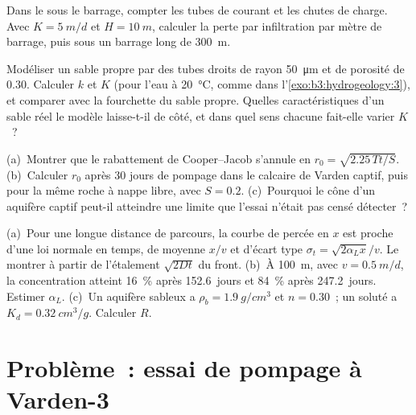 \begin{exercise}[$\star\star$]\label{exo:b3:hydrogeology:9}
Dans le  sous le barrage, compter les tubes de courant et les chutes de charge.
Avec $K = \qty{5}{m/d}$ et $H = \qty{10}{m}$, calculer la perte par infiltration par
mètre de barrage, puis sous un barrage long de \qty{300}{m}.
\end{exercise}

\begin{exercise}[$\star\star\star$]\label{exo:b3:hydrogeology:10}
Modéliser un sable propre par des tubes droits de rayon \qty{50}{\micro\metre} et de
porosité de 0.30. Calculer $k$ et $K$ (pour l'eau à \qty{20}{\celsius}, comme dans
l'\cref{exo:b3:hydrogeology:3}),
et comparer avec la fourchette du sable propre. Quelles caractéristiques d'un sable réel
le modèle laisse-t-il de côté, et dans quel sens chacune fait-elle varier $K$~?
\end{exercise}

\begin{exercise}[$\star\star\star$]\label{exo:b3:hydrogeology:11}
(a)~Montrer que le rabattement de Cooper--Jacob s'annule en $r_0 =
\sqrt{2.25\,Tt/S}$. (b)~Calculer $r_0$ après 30 jours de pompage dans le
calcaire de Varden captif, puis pour la même roche à nappe libre, avec $S =
0.2$. (c)~Pourquoi le cône d'un aquifère captif peut-il atteindre une limite que l'essai
n'était pas censé détecter~?
\end{exercise}

\begin{exercise}[$\star\star\star$]\label{exo:b3:hydrogeology:12}
(a)~Pour une longue distance de parcours, la courbe de percée en $x$ est proche d'une
loi normale en temps, de moyenne $x/v$ et d'écart type $\sigma_t
= \sqrt{2\alpha_Lx}/v$. Le montrer à partir de l'étalement $\sqrt{2Dt}$ du front.
(b)~À \qty{100}{m}, avec $v = \qty{0.5}{m/d}$, la concentration atteint
\qty{16}{\percent} après \num{152.6}~jours et \qty{84}{\percent} après
\num{247.2}~jours. Estimer $\alpha_L$. (c)~Un aquifère sableux a $\rho_b =
\qty{1.9}{g/cm^3}$ et $n = 0.30$~; un soluté a $K_d =
\qty{0.32}{cm^3/g}$. Calculer $R$.
\end{exercise}

\section{Problème~: essai de pompage à Varden-3}

